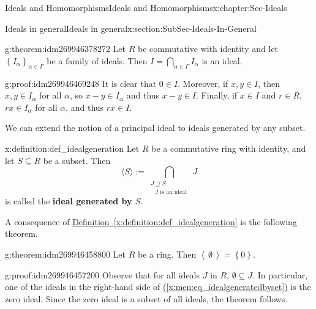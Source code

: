 \documentclass[oneside,10pt,]{book}
\newcommand{\terminology}[1]{\textbf{#1}}
\numberwithin{equation}{section}
\newcommand{\ideal}[1]{\left\langle\, #1 \,\right\rangle}
\newcommand{\set}[1]{\left\{ {#1} \right\}}
\begin{document}
%
%
\typeout{************************************************}
\typeout{************************************************}
%
\begin{chapterptx}{Ideals and Homomorphisms}{}{Ideals and Homomorphisms}{}{}{x:chapter:Sec-Ideals}
%
%
\typeout{************************************************}
\typeout{************************************************}
%
\begin{sectionptx}{Ideals in general}{}{Ideals in general}{}{}{x:section:SubSec-Ideals-In-General}
\begin{theorem}{}{}{g:theorem:idm269946378272}%
Let \(R\) be commutative with identity and let \(\set{I_{\alpha}}_{\alpha\in \Gamma}\) be a family of ideals. Then \(I = \bigcap\limits_{\alpha\in \Gamma} I_\alpha\) is an ideal.%
\end{theorem}
\begin{proofptx}{}{g:proof:idm269946469248}
It is clear that \(0\in I\). Moreover, if \(x,y\in I\), then \(x,y\in I_\alpha\) for all \(\alpha\), so \(x-y\in I_\alpha\) and thus \(x-y\in I\). Finally, if \(x\in I\) and \(r\in R\), \(rx\in I_\alpha\) for all \(\alpha\), and thus \(rx\in I\).%
\end{proofptx}
We can extend the notion of a principal ideal to ideals generated by any subset.%
\begin{definition}{}{x:definition:def_idealgeneration}%
Let \(R\) be a commutative ring with identity, and let \(S\subseteq R\) be a subset. Then%
\begin{equation}
\langle S \rangle := \bigcap\limits_{\substack{J\supseteq S\\\text{ \(J\) is an ideal } } } J\label{x:men:eq_idealgeneratedbyset}
\end{equation}
is called the \terminology{ideal generated by \(S\)}.%
\end{definition}
A consequence of \hyperref[x:definition:def_idealgeneration]{Definition~\ref{x:definition:def_idealgeneration}} is the following theorem.%
\begin{theorem}{}{}{g:theorem:idm269946458800}%
Let \(R\) be a ring. Then \(\ideal{\emptyset} = \set{0}\).\end{theorem}
\begin{proofptx}{}{g:proof:idm269946457200}
Observe that for all ideals \(J\) in \(R\), \(\emptyset\subseteq J\). In particular, one of the ideals in the right-hand side of \hyperref[x:men:eq_idealgeneratedbyset]{(\ref{x:men:eq_idealgeneratedbyset})} is the zero ideal. Since the zero ideal is a subset of all ideals, the theorem follows.%

\end{proofptx}
\end{sectionptx}
\end{chapterptx}
\end{document}
